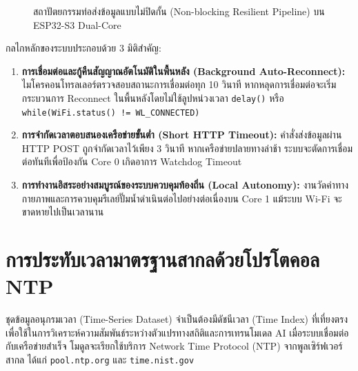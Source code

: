 \begin{figure}[htbp]
{
}
\caption{สถาปัตยกรรมท่อส่งข้อมูลแบบไม่ปิดกั้น (Non-blocking Resilient Pipeline) บน ESP32-S3 Dual-Core}
\label{fig:tikz_telemetry_pipeline}
\end{figure}

กลไกหลักของระบบประกอบด้วย 3 มิติสำคัญ:
\begin{enumerate}
    \item \textbf{การเชื่อมต่อและกู้คืนสัญญาณอัตโนมัติในพื้นหลัง (Background Auto-Reconnect):} ไมโครคอนโทรลเลอร์ตรวจสอบสถานะการเชื่อมต่อทุก 10 วินาที หากหลุดการเชื่อมต่อจะเริ่มกระบวนการ Reconnect ในพื้นหลังโดยไม่ใช้ลูปหน่วงเวลา \texttt{delay()} หรือ \texttt{while(WiFi.status() != WL\_CONNECTED)}
    \item \textbf{การจำกัดเวลาตอบสนองเครือข่ายขั้นต่ำ (Short HTTP Timeout):} คำสั่งส่งข้อมูลผ่าน HTTP POST ถูกจำกัดเวลาไว้เพียง 3 วินาที หากเครือข่ายปลายทางล่าช้า ระบบจะตัดการเชื่อมต่อทันทีเพื่อป้องกัน Core 0 เกิดอาการ Watchdog Timeout
    \item \textbf{การทำงานอิสระอย่างสมบูรณ์ของระบบควบคุมท้องถิ่น (Local Autonomy):} งานวัดค่าทางกายภาพและการควบคุมรีเลย์ปั๊มน้ำดำเนินต่อไปอย่างต่อเนื่องบน Core 1 แม้ระบบ Wi-Fi จะขาดหายไปเป็นเวลานาน
\end{enumerate}

\section{การประทับเวลามาตรฐานสากลด้วยโปรโตคอล NTP}

ชุดข้อมูลอนุกรมเวลา (Time-Series Dataset) จำเป็นต้องมีดัชนีเวลา (Time Index) ที่เที่ยงตรงเพื่อใช้ในการวิเคราะห์ความสัมพันธ์ระหว่างตัวแปรทางสถิติและการเทรนโมเดล AI เมื่อระบบเชื่อมต่อกับเครือข่ายสำเร็จ โมดูลจะเรียกใช้บริการ Network Time Protocol (NTP) จากพูลเซิร์ฟเวอร์สากล ได้แก่ \texttt{pool.ntp.org} และ \texttt{time.nist.gov}

